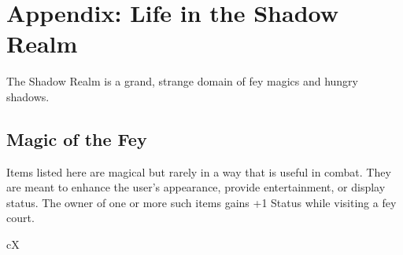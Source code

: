 \documentclass[10pt,a4paper,twoside,bg=print,twocolumn,openany,nodeprecatedcode]{dndbook}
\begin{document}
\appendix
\chapter{Appendix: Life in the Shadow Realm}
The Shadow Realm is a grand, strange domain of fey magics and hungry shadows.

\section{Magic of the Fey}
Items listed here are magical but rarely in a way that is useful in combat. They are meant to enhance the user's appearance, provide entertainment, or display status. The owner of one or more such items gains +1 Status while visiting a fey court.

\begin{DndTable}[header=Lesser Umbral Items of the Shadow Fey]{cX}


\end{DndTable}
\end{document}

